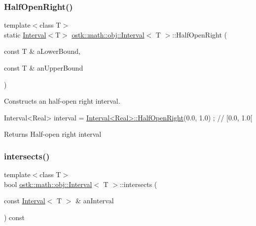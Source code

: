 \subsubsection{\texorpdfstring{Half\+Open\+Right()}{HalfOpenRight()}}
{\footnotesize\ttfamily template$<$class T$>$ \\
static \hyperlink{classostk_1_1math_1_1obj_1_1_interval}{Interval}$<$T$>$ \hyperlink{classostk_1_1math_1_1obj_1_1_interval}{ostk\+::math\+::obj\+::\+Interval}$<$ T $>$\+::Half\+Open\+Right (\begin{DoxyParamCaption}\item[{const T \&}]{a\+Lower\+Bound,  }\item[{const T \&}]{an\+Upper\+Bound }\end{DoxyParamCaption})\hspace{0.3cm}{\ttfamily [static]}}



Constructs an half-\/open right interval. 


\begin{DoxyCode}
Interval<Real> interval = \hyperlink{classostk_1_1math_1_1obj_1_1_interval_abe98617b87988bf157703cbd04bb1905}{Interval<Real>::HalfOpenRight}(0.0, 1.0) ; \textcolor{comment}{// [0.0,
       1.0[}
\end{DoxyCode}


\begin{DoxyReturn}{Returns}
Half-\/open right interval 
\end{DoxyReturn}
\mbox{\label{classostk_1_1math_1_1obj_1_1_interval_a58c2b405e2c5606cb774efac35bbd624}} 
\subsubsection{\texorpdfstring{intersects()}{intersects()}}
{\footnotesize\ttfamily template$<$class T$>$ \\
bool \hyperlink{classostk_1_1math_1_1obj_1_1_interval}{ostk\+::math\+::obj\+::\+Interval}$<$ T $>$\+::intersects (\begin{DoxyParamCaption}\item[{const \hyperlink{classostk_1_1math_1_1obj_1_1_interval}{Interval}$<$ T $>$ \&}]{an\+Interval }\end{DoxyParamCaption}) const}



